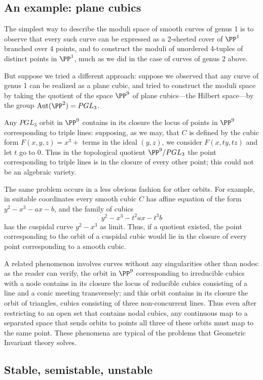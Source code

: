 \subsection{An example: plane cubics}

The simplest way to describe the moduli space of smooth curves of genus 1 is to observe that every such curve can be expressed as a 2-sheeted cover of $\PP^1$ branched over 4 points, and to construct the moduli of unordered 4-tuples of distinct points in $\PP^1$, much as we did in the case of curves of genus 2 above.

But suppose we tried a different approach: suppose we observed that any curve of genus 1 can be realized as a plane cubic, and tried to construct the moduli space by taking the quotient of the space $\PP^9$ of plane cubics---the Hilbert space---by the group ${\rm Aut}(\PP^2) = PGL_3$. 

Any $PGL_3$ orbit in $\PP^9$ contains in its closure the locus of points in $\PP^9$ corresponding to triple lines: supposing, as we may, that $C$ is defined by the cubic form $F(x,y,z) = x^3+$ terms in the ideal $(y,z)$,
we consider $F(x,ty, tz)$ and let $t$ go to 0. Thus in the topological quotient $\PP^9/PGL_3$ the point corresponding to triple lines is in the closure of every other point; this could not be an algebraic variety.

The same problem occurs in a less obvious fashion for other orbits. For example, in suitable coordinates every smooth cubic $C$ has affine equation of the form $y^2-x^3 - ax - b$, and the family of cubics
$$
y^2 - x^3 - t^2ax - t^3b
$$
has the cuspidal curve $y^2-x^3$ as limit.
Thus, if a quotient existed, the point corresponding to the orbit of a cuspidal cubic would lie in the closure of every point corresponding to a smooth cubic. 

A related phenomenon involves curves without any singularities other than nodes: as the reader can verify, the orbit in $\PP^9$ corresponding to irreducible cubics with a node contains in its closure the locus of reducible cubics consisting of a line and a conic meeting transversely; and this orbit contains in its closure the orbit of triangles, cubics consisting of three non-concurrent lines. Thus even after restricting to an open set that contains nodal cubics, any continuous map 
to a separated space that sends orbits to points all three of these orbits must map to the same point.
These phenomena are typical of the problems that Geometric Invariant theory solves.

\subsection{Stable, semistable, unstable}

